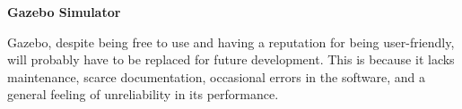 \textbf{Gazebo Simulator}

Gazebo, despite being free to use and having a reputation for being user-friendly, will probably have to be replaced for future development. This is because it lacks maintenance, scarce documentation, occasional errors in the software, and a general feeling of unreliability in its performance. 